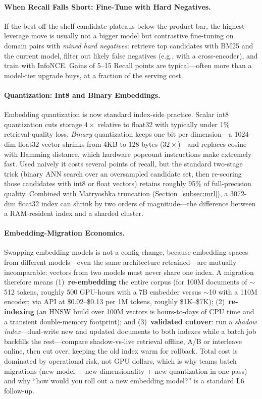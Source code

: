 \paragraph{When Recall Falls Short: Fine-Tune with Hard Negatives.}
If the best off-the-shelf candidate plateaus below the product bar, the
highest-leverage move is usually not a bigger model but contrastive
fine-tuning on domain pairs with \emph{mined hard negatives}: retrieve top
candidates with BM25 and the current model, filter out likely false
negatives (e.g., with a cross-encoder), and train with InfoNCE.  Gains of
5--15 Recall points are typical---often more than a model-tier upgrade
buys, at a fraction of the serving cost.

\paragraph{Quantization: Int8 and Binary Embeddings.}
Embedding quantization is now standard index-side practice.  Scalar int8
quantization cuts storage $4\times$ relative to float32 with typically
under 1\% retrieval-quality loss.  \emph{Binary} quantization keeps one bit
per dimension---a 1024-dim float32 vector shrinks from 4KB to 128
bytes ($32\times$)---and replaces cosine with Hamming distance, which
hardware popcount instructions make extremely fast.  Used naively it costs
several points of recall, but the standard two-stage trick (binary ANN
search over an oversampled candidate set, then re-scoring those candidates
with int8 or float vectors) retains roughly 95\% of full-precision quality.
Combined with Matryoshka truncation
(Section~\ref{subsec:mrl}), a 3072-dim float32 index can shrink by two
orders of magnitude---the difference between a RAM-resident index and a
sharded cluster.

\paragraph{Embedding-Migration Economics.}
Swapping embedding models is not a config change, because embedding spaces
from different models---even the same architecture retrained---are mutually
incomparable: vectors from two models must never share one index.  A
migration therefore means (1)~\textbf{re-embedding} the entire corpus (for
100M documents of $\sim$512 tokens, roughly 500 GPU-hours with a 7B
embedder versus $\sim$10 with a 110M encoder; via API at
\$0.02--\$0.13 per 1M tokens, roughly \$1K--\$7K); (2)~\textbf{re-indexing}
(an HNSW build over 100M vectors is hours-to-days of CPU time and a
transient double-memory footprint); and (3)~\textbf{validated cutover}: run
a \emph{shadow index}---dual-write new and updated documents to both
indexes while a batch job backfills the rest---compare shadow-vs-live
retrieval offline, A/B or interleave online, then cut over, keeping the old
index warm for rollback.  Total cost is dominated by operational risk, not
GPU dollars, which is why teams batch migrations (new model + new
dimensionality + new quantization in one pass) and why ``how would you roll
out a new embedding model?'' is a standard L6 follow-up.

